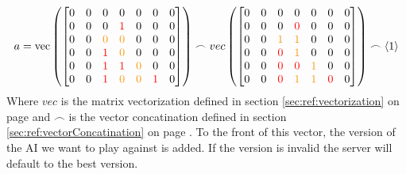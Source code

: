 \documentclass[12pt]{article}
\newcommand{\sectionref}[1]{section \ref{#1} on page \pageref{#1}}
\newcommand{\mathColor}[2]{\color{#1}#2\color{black}}
\newcommand{\gold}{YellowOrange}
\begin{document}
\begin{equation}
a =
\text{vec}\left(\left[\begin{matrix}
\mathColor{black}{0} & \mathColor{black}{0} & \mathColor{black}{0} & \mathColor{black}{0} & \mathColor{black}{0} & \mathColor{black}{0} & \mathColor{black}{0}\\
\mathColor{black}{0} & \mathColor{black}{0} & \mathColor{black}{0} & \mathColor{red}{1}     & \mathColor{black}{0} & \mathColor{black}{0} & \mathColor{black}{0}\\
\mathColor{black}{0} & \mathColor{black}{0} & \mathColor{\gold}{0} & \mathColor{\gold}{0} & \mathColor{black}{0} & \mathColor{black}{0} & \mathColor{black}{0}\\
\mathColor{black}{0} & \mathColor{black}{0} & \mathColor{red}{1}     & \mathColor{\gold}{0} & \mathColor{black}{0} & \mathColor{black}{0} & \mathColor{black}{0}\\
\mathColor{black}{0} & \mathColor{black}{0} & \mathColor{red}{1}     & \mathColor{red}{1}     & \mathColor{\gold}{0} & \mathColor{black}{0} & \mathColor{black}{0}\\
\mathColor{black}{0} & \mathColor{black}{0} & \mathColor{red}{1}     & \mathColor{\gold}{0} & \mathColor{\gold}{0} & \mathColor{red}{1}     & \mathColor{black}{0}\\
\end{matrix}
\right]\right)
\frown vec
\left(\left[
\begin{matrix}
\mathColor{black}{0} & \mathColor{black}{0} & \mathColor{black}{0} & \mathColor{black}{0} & \mathColor{black}{0} & \mathColor{black}{0} & \mathColor{black}{0}\\
\mathColor{black}{0} & \mathColor{black}{0} & \mathColor{black}{0} & \mathColor{red}{0}     & \mathColor{black}{0} & \mathColor{black}{0} & \mathColor{black}{0}\\
\mathColor{black}{0} & \mathColor{black}{0} & \mathColor{\gold}{1} & \mathColor{\gold}{1} & \mathColor{black}{0} & \mathColor{black}{0} & \mathColor{black}{0}\\
\mathColor{black}{0} & \mathColor{black}{0} & \mathColor{red}{0}     & \mathColor{\gold}{1} & \mathColor{black}{0} & \mathColor{black}{0} & \mathColor{black}{0}\\
\mathColor{black}{0} & \mathColor{black}{0} & \mathColor{red}{0}     & \mathColor{red}{0}     & \mathColor{\gold}{1} & \mathColor{black}{0} & \mathColor{black}{0}\\
\mathColor{black}{0} & \mathColor{black}{0} & \mathColor{red}{0}     & \mathColor{\gold}{1} & \mathColor{\gold}{1} & \mathColor{red}{0}     & \mathColor{black}{0}\\
\end{matrix}\right]\right)\frown \left<1\right>
\end{equation}
Where \(vec\) is the matrix vectorization defined in \sectionref{sec:ref:vectorization} and \(\frown\) is the vector concatination defined in \sectionref{sec:ref:vectorConcatination}.
To the front of this vector, the version of the AI we want to play against is added. If the version is invalid the server will default to the best version.
\end{document}
